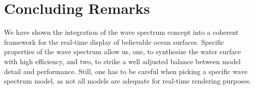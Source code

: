 \section{Concluding Remarks}
We have shown the integration of the wave spectrum concept into a
coherent framework for the real-time display of believable ocean
surfaces. Specific properties of the wave spectrum allow us, one,
to synthesize the water surface with high efficiency, and two, to
strike a well adjusted balance between model detail and performance.
Still, one has to be careful when picking a specific wave spectrum
model, as not all models are adequate for real-time rendering purposes.
% 
%
%

